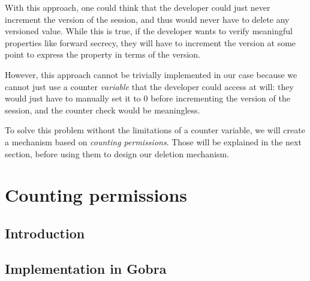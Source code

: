 With this approach, one could think that the developer could just never increment the version of the session, and thus would never have to delete any versioned value. While this is true, if the developer wants to verify meaningful properties like forward secrecy, they will have to increment the version at some point to express the property in terms of the version.

However, this approach cannot be trivially implemented in our case because we cannot just use a counter \emph{variable} that the developer could access at will: they would just have to manually set it to $0$ before incrementing the version of the session, and the counter check would be meaningless.

To solve this problem without the limitations of a counter variable, we will create a mechanism based on \emph{counting permissions}. Those will be explained in the next section, before using them to design our deletion mechanism.

\section{Counting permissions}

\subsection{Introduction}

\subsection{Implementation in Gobra}
